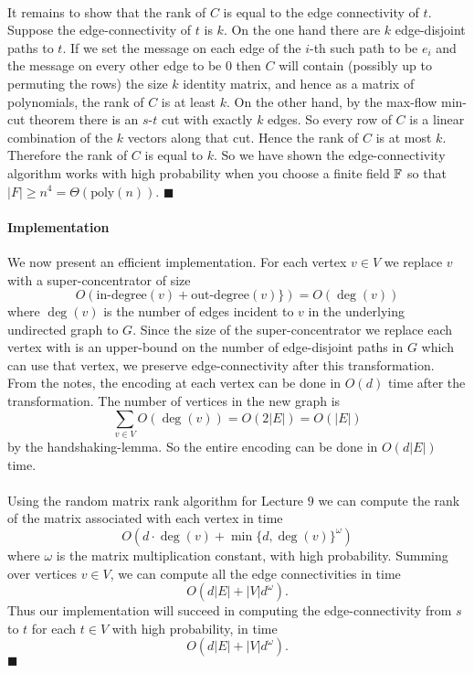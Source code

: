 \documentclass[letterpaper,12pt,oneside,onecolumn]{article}
\begin{document}
\paragraph{}
It remains to show that the rank of $C$ is equal to the edge connectivity of $t$. Suppose the edge-connectivity of $t$ is $k$. On the one hand there are $k$ edge-disjoint paths to $t$. If we set the message on each edge of the $i$-th such path to be $e_i$ and the message on every other edge to be $0$ then $C$ will contain (possibly up to permuting the rows) the size $k$ identity matrix, and hence as a matrix of polynomials, the rank of $C$ is at least $k$. On the other hand, by the max-flow min-cut theorem there is an $s$-$t$ cut with exactly $k$ edges. So every row of $C$ is a linear combination of the $k$ vectors along that cut. Hence the rank of $C$ is at most $k$. Therefore the rank of $C$ is equal to $k$. So we have shown the edge-connectivity algorithm works with high probability when you choose a finite field $\mathbb{F}$ so that $|F| \geq n^4 = \Theta(\text{poly}(n))$. $\blacksquare$
\paragraph{Implementation}
We now present an efficient implementation. For each vertex $v \in V$ we replace $v$ with a super-concentrator of size
$$O(\text{in-degree}(v) + \text{out-degree}(v)\}) = O(\deg(v))$$
where $\deg(v)$ is the number of edges incident to $v$ in the underlying undirected graph to $G$. Since the size of the super-concentrator we replace each vertex with is an upper-bound on the number of edge-disjoint paths in $G$ which can use that vertex, we preserve edge-connectivity after this transformation. From the notes, the encoding at each vertex can be done in $O(d)$ time after the transformation. The number of vertices in the new graph is 
$$\sum_{v \in V} O(\deg(v)) = O(2|E|) = O(|E|)$$
by the handshaking-lemma. So the entire encoding can be done in $O(d|E|)$ time.
\paragraph{}
Using the random matrix rank algorithm for Lecture $9$ we can compute the rank of the matrix associated with each vertex in time
$$O(d\cdot \deg(v) + \min\{d,\deg(v)\}^\omega)$$
where $\omega$ is the matrix multiplication constant, with high probability. Summing over vertices $v \in V$, we can compute all the edge connectivities in time
$$O(d|E| + |V|d^\omega).$$
Thus our implementation will succeed in computing the edge-connectivity from $s$ to $t$ for each $t \in V$ with high probability, in time
$$O(d|E| +|V|d^{\omega}).$$
$\blacksquare$
\end{document}
